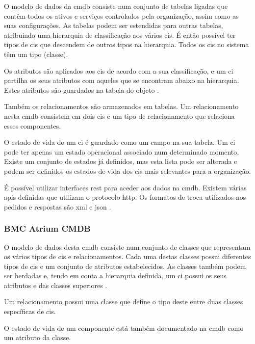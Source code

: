 \documentclass[
  oneside,
  11pt, a4paper,
  footinclude=true,
  headinclude=true,
  cleardoublepage=empty
]{scrbook}
\begin{document}
    O modelo de dados da \gls{cmdb} consiste num conjunto de tabelas ligadas que contêm todos os ativos e serviços controlados pela organização, assim como as suas configurações. As tabelas podem ser estendidas para outras tabelas, atribuindo uma hierarquia de classificação aos vários \glspl{ci}. É então possível ter tipos de \glspl{ci} que descendem de outros tipos na hierarquia. Todos os \glspl{ci} no sistema têm um tipo (classe). 
    
    Os atributos são aplicados aos \glspl{ci} de acordo com a sua classificação, e um \gls{ci} partilha os seus atributos com aqueles que se encontram abaixo na hierarquia. Estes atributos são guardados na tabela do objeto \cite{servicenowdoc}.
    
    Também os relacionamentos são armazenados em tabelas. Um relacionamento nesta \gls{cmdb} consistem em dois \glspl{ci} e um tipo de relacionamento que relaciona esses componentes.
    
    O estado de vida de um \gls{ci} é guardado como um campo na sua tabela. Um \gls{ci} pode ter apenas um estado operacional associado num determinado momento. Existe um conjunto de estados já definidos, mas esta lista pode ser alterada e podem ser definidos os estados de vida dos \glspl{ci} mais relevantes para a organização.
    
    É possível utilizar interfaces \gls{rest} para aceder aos dados na \gls{cmdb}. Existem várias \glspl{api} definidas que utilizam o protocolo \gls{http}. Os formatos de troca utilizados nos pedidos e respostas são \gls{xml} e \gls{json} \cite{servicenowdoc}.
    
\subsubsection{\textbf{BMC Atrium CMDB}}
    
    O modelo de dados desta \gls{cmdb} consiste num conjunto de classes que representam os vários tipos de \glspl{ci} e relacionamentos. Cada uma destas classes possui diferentes tipos de \glspl{ci} e um conjunto de atributos estabelecidos. As classes também podem ser herdadas e, tendo em conta a hierarquia definida, um \gls{ci} possui os seus atributos e das classes superiores \cite{bmcatrium}.
    
    Um relacionamento possui uma classe que define o tipo deste entre duas classes específicas de \glspl{ci}.
    
    O estado de vida de um componente está também documentado na \gls{cmdb} como um atributo da classe.
    
\end{document}

